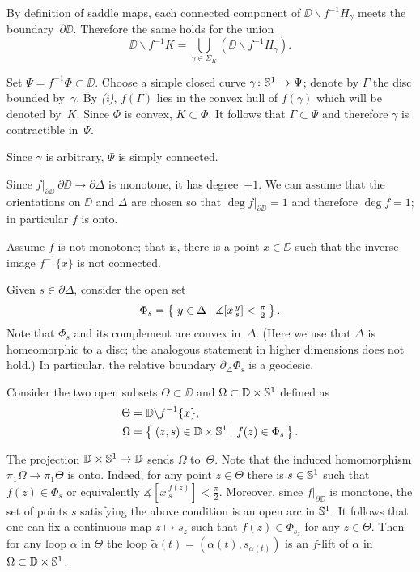 \documentclass{article}
\begin{document}
By definition of saddle maps, each connected component of $\DD\backslash f^{-1}H_\gamma$ meets the boundary~$\partial\DD$.
Therefore the same holds for the union
\[\DD\backslash f^{-1}K=\bigcup_{\gamma\in\Sigma_K}(\DD\backslash f^{-1}H_\gamma).\]

Set $\Psi=f^{-1}\Phi\subset\DD$.
Choose a simple closed curve $\gamma\colon\mathbb{S}^1\to\Psi$;
denote by $\Gamma$ the disc bounded by~$\gamma$.
By \textit{(i)}, $f(\Gamma)$ lies in the convex hull of $f(\gamma)$ which will be denoted by~$K$.
Since $\Phi$ is convex, $K\subset \Phi$.
It follows that $\Gamma\subset\Psi$ and therefore $\gamma$ is contractible in~$\Psi$.

Since $\gamma$ is arbitrary, $\Psi$ is simply connected.
\qeds

Since $f|_{\partial\DD}\:\partial\DD \to\partial \Delta$ is monotone, it has degree~$\pm1$.
We can assume that the orientations on $\DD$ and $\Delta$ are chosen so that $\deg f|_{\partial\DD}=1$
and therefore $\deg f=1$;
in particular $f$ is onto.

Assume $f$ is not monotone;
that is, there is a point $x\in \DD$ such that the inverse image $f^{-1}\{x\}$ is not connected.

Given $s\in\partial \Delta$, consider the open set
\[\Phi_s=\set{y\in\Delta}{\measuredangle [x\,^y_s]<\tfrac\pi2}.\]
Note that $\Phi_s$ and its complement are convex in~$\Delta$.
(Here we use that $\Delta$ is homeomorphic to a disc; the analogous statement in higher dimensions does not hold.)
In particular, the relative boundary $\partial_\Delta\Phi_s$ is a geodesic.

Consider the two open subsets $\Theta\subset \DD$ and $\Omega\subset\mathbb{D}\times\mathbb{S}^1$ defined as
\begin{align*}
\Theta&=\DD\backslash f^{-1}\{x\},
\\
\Omega&=\set{(z,s)\in \DD\times\SS^1}{f(z)\in \Phi_s}.
\end{align*}

The projection $\mathbb{D}\times\mathbb{S}^1\to \mathbb{D}$ sends $\Omega$ to~$\Theta$.
Note that the induced homomorphism $\pi_1\Omega\to \pi_1\Theta$ is onto.
Indeed, for any point $z\in \Theta$ there is $s\in \mathbb{S}^1$ such that $f(z)\in \Phi_s$ or equivalently $\measuredangle [x\,^{f(z)}_s]<\tfrac\pi2$.
Moreover, since $f|_{\partial\DD}$ is monotone, the set of points $s$ satisfying the above condition is an open arc in $\mathbb{S}^1$.
It follows that one can fix a continuous map $z\mapsto s_z$ such that $f(z)\in \Phi_{s_z}$ for any $z\in \Theta$.
Then for any loop $\alpha$ in $\Theta$ the loop $\tilde\alpha(t)=(\alpha(t),s_{\alpha(t)})$ is an $f$-lift of $\alpha$ in $\Omega\subset\mathbb{D}\times\mathbb{S}^1$.
\end{document}
